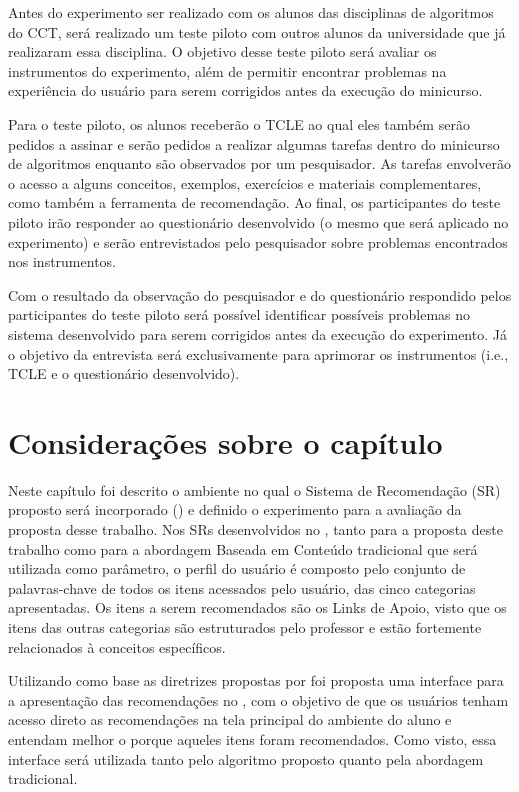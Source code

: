 Antes do experimento ser realizado com os alunos das disciplinas de algoritmos do CCT, será realizado um teste piloto com
outros alunos da universidade que já realizaram essa disciplina. O objetivo desse teste piloto será avaliar os
instrumentos do experimento, além de permitir encontrar problemas na experiência do  usuário para serem corrigidos
antes da execução do minicurso.

Para o teste piloto, os alunos receberão o TCLE ao qual eles também serão pedidos a assinar e serão pedidos a realizar algumas
tarefas dentro do minicurso de algoritmos enquanto são observados por um pesquisador. As tarefas envolverão o acesso a
alguns conceitos, exemplos, exercícios e materiais complementares, como também a ferramenta de recomendação. Ao final, os
participantes do teste piloto irão responder ao questionário desenvolvido (o mesmo que será aplicado no experimento) e
serão entrevistados pelo pesquisador sobre problemas encontrados nos instrumentos.

Com o resultado da observação do pesquisador e do questionário respondido pelos participantes do teste piloto será possível
identificar possíveis problemas no sistema desenvolvido para serem corrigidos antes da execução do experimento. Já o objetivo da
entrevista será exclusivamente para aprimorar os instrumentos (i.e., TCLE e o questionário desenvolvido).

\section{Considerações sobre o capítulo}

Neste capítulo foi descrito o ambiente no qual o Sistema de Recomendação (SR) proposto será incorporado (\adaptweb) e definido o
experimento para a avaliação da proposta desse trabalho. Nos SRs desenvolvidos no \adaptweb, tanto para a proposta deste trabalho como para a abordagem
Baseada em Conteúdo tradicional que será utilizada como parâmetro, o perfil do usuário é composto pelo conjunto de palavras-chave de todos os itens acessados pelo usuário, das
cinco categorias apresentadas. Os itens a serem recomendados são os Links de Apoio, visto que os itens das outras categorias
são estruturados pelo professor e estão fortemente relacionados à conceitos específicos.

Utilizando como base as diretrizes propostas por  foi proposta uma interface para a apresentação das recomendações no \adaptweb,
com o objetivo de que os usuários tenham acesso direto as recomendações na tela principal do ambiente do aluno e entendam
melhor o porque aqueles itens foram recomendados. Como visto, essa interface será utilizada tanto pelo algoritmo proposto
quanto pela abordagem tradicional.

